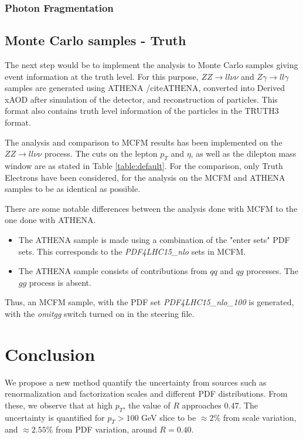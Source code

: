 \documentclass[11pt,a4paper,final]{report}
\newcommand{\ZZ}{$ZZ\rightarrow ll\nu\nu$ }
\begin{document}
\subsubsection{Photon Fragmentation}

\subsection{Monte Carlo samples - Truth}
The next step would be to implement the analysis to Monte Carlo samples giving event information at the truth level. For this purpose, $ZZ\rightarrow ll\nu\nu$ and $Z\gamma \rightarrow ll\gamma$ samples are generated using ATHENA /cite{ATHENA}, converted into Derived xAOD after simulation of the detector, and reconstruction of particles. This format also contains truth level information of the particles in the TRUTH3 format.

The analysis and comparison to MCFM results has been implemented on the \ZZ process. The cuts on the lepton $p_T$ and $\eta$, as well as the dilepton mass window are as stated in Table \ref{table:default}. For the comparison, only Truth Electrons have been considered, for the analysis on the MCFM and ATHENA samples to be as identical as possible. 

There are some notable differences between the analysis done with MCFM to the one done with ATHENA.
\begin{itemize}
	\item The ATHENA sample is made using a combination of the "enter sets" PDF sets. This corresponds to the \textit{PDF4LHC15_nlo} sets in MCFM.
	\item The ATHENA sample consists of contributions from $qq$ and $qg$ processes. The $gg$ process is absent.
\end{itemize}

Thus, an MCFM sample, with the PDF set \textit{PDF4LHC15_nlo_100} is generated, with the \textit{omitgg} switch turned on in the steering file.

\section{Conclusion}
We propose a new method quantify the uncertainty from sources such as renormalization and factorization scales and different PDF distributions. From these, we observe that at high $p_T$, the value of $R$ approaches $0.47$. The uncertainty is quantified for $p_T > 100$ GeV slice to be $\approx 2\%$ from scale variation, and $\approx 2.55\%$ from PDF variation, around $R = 0.40$.
\end{document}
